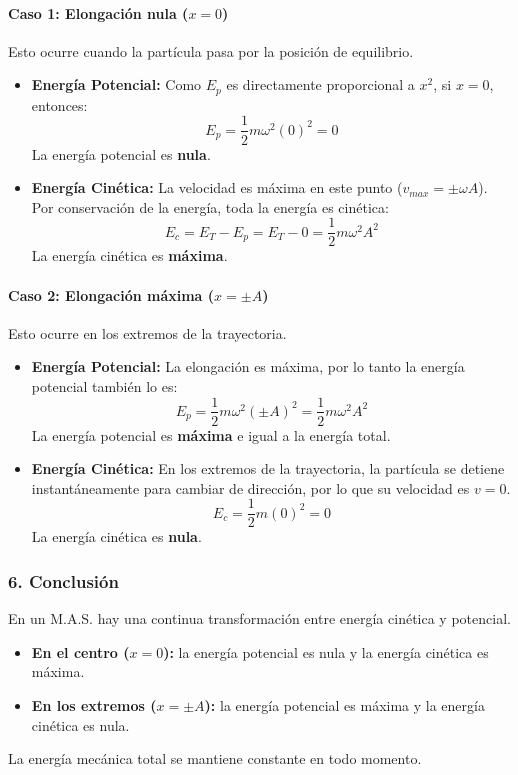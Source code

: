 \paragraph{Caso 1: Elongación nula ($x=0$)}
Esto ocurre cuando la partícula pasa por la posición de equilibrio.
\begin{itemize}
    \item \textbf{Energía Potencial:} Como $E_p$ es directamente proporcional a $x^2$, si $x=0$, entonces:
    $$ E_p = \frac{1}{2}m\omega^2(0)^2 = 0 $$
    La energía potencial es \textbf{nula}.
    \item \textbf{Energía Cinética:} La velocidad es máxima en este punto ($v_{max}=\pm\omega A$). Por conservación de la energía, toda la energía es cinética:
    $$ E_c = E_T - E_p = E_T - 0 = \frac{1}{2}m\omega^2A^2 $$
    La energía cinética es \textbf{máxima}.
\end{itemize}

\paragraph{Caso 2: Elongación máxima ($x=\pm A$)}
Esto ocurre en los extremos de la trayectoria.
\begin{itemize}
    \item \textbf{Energía Potencial:} La elongación es máxima, por lo tanto la energía potencial también lo es:
    $$ E_p = \frac{1}{2}m\omega^2(\pm A)^2 = \frac{1}{2}m\omega^2A^2 $$
    La energía potencial es \textbf{máxima} e igual a la energía total.
    \item \textbf{Energía Cinética:} En los extremos de la trayectoria, la partícula se detiene instantáneamente para cambiar de dirección, por lo que su velocidad es $v=0$.
    $$ E_c = \frac{1}{2}m(0)^2 = 0 $$
    La energía cinética es \textbf{nula}.
\end{itemize}

\subsubsection*{6. Conclusión}
\begin{cajaconclusion}
En un M.A.S. hay una continua transformación entre energía cinética y potencial.
\begin{itemize}
    \item \textbf{En el centro ($x=0$):} la energía potencial es nula y la energía cinética es máxima.
    \item \textbf{En los extremos ($x=\pm A$):} la energía potencial es máxima y la energía cinética es nula.
\end{itemize}
La energía mecánica total se mantiene constante en todo momento.
\end{cajaconclusion}

